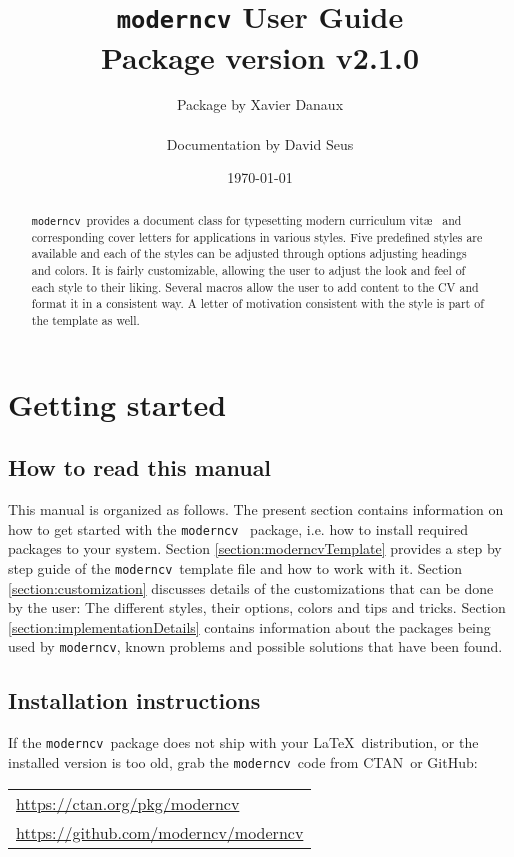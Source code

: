 \documentclass[a4paper,11pt]{article}
\title{\texttt{moderncv} User Guide\\{\small Package version v2.1.0}}
\author{Package by Xavier Danaux \\ \begin{small}Documentation by David Seus \end{small}}
\date{\today}
\newcommand{\code}[1]{\lstinline!#1!}
\newcommand{\Code}[1]{\lstinline!#1!~} %
\newcommand{\moderncv}{\code{moderncv}}
\newcommand{\Moderncv}{\Code{moderncv}}
\newcommand{\github}{GitHub}
\newcommand{\Ctan}{CTAN~}
\newcommand{\moderncvGithub}{\url{https://github.com/moderncv/moderncv}}
\newcommand{\moderncvCtan}{\url{https://ctan.org/pkg/moderncv}}
\begin{document}
\maketitle
\begin{abstract}
\noindent 
\Moderncv provides a document class for typesetting modern curriculum vit\ae~ and corresponding cover letters 
for applications in various styles. 
Five predefined styles are available and each of the styles can be adjusted through options adjusting headings and colors.  
It is fairly customizable, allowing the user to adjust the look and feel of each style to their liking.
Several macros allow the user to add content to the CV and format it in a consistent way. 
A letter of motivation consistent with the style is part of the template as well. 
\end{abstract}
\tableofcontents

\section{Getting started}
\subsection{How to read this manual}
This manual is organized as follows.
The present section contains information on how to get started with the \Moderncv 
package, i.e. how to install required packages to your system.
% 
% 
Section \ref{section:moderncvTemplate} provides a step by step guide of the \Moderncv template file and how to work with it. 
% 
Section \ref{section:customization} discusses details of the customizations that can be done by the user: 
The different styles, their options, colors and tips and tricks.
% 
Section \ref{section:implementationDetails} contains information about the packages being used by \moderncv, 
known problems and possible solutions that have been found. 

\subsection{Installation instructions}
If the \Moderncv package does not ship with your \LaTeX\ distribution, or the installed version is too old, 
grab the \Moderncv code from \Ctan or \github: \medskip

\begin{tabular}{l}
  \moderncvCtan \\%
  \moderncvGithub
\end{tabular}
\end{document}
